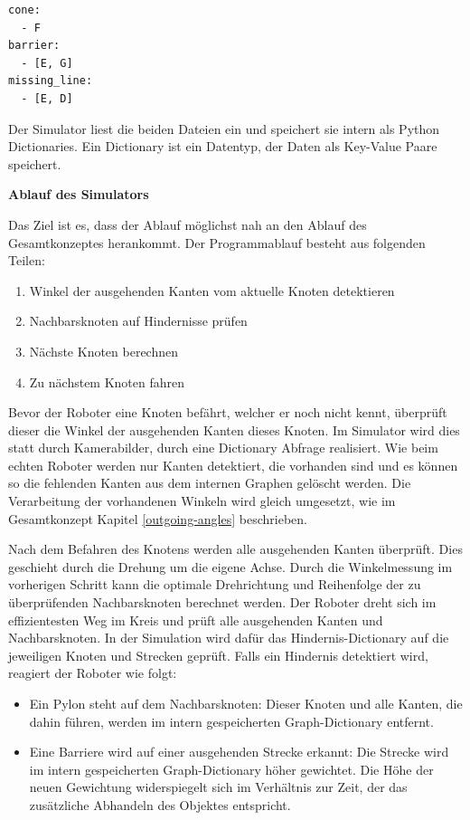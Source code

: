 \begin{verbatim}
cone:
  - F
barrier:
  - [E, G]
missing_line:
  - [E, D]
\end{verbatim}

Der Simulator liest die beiden Dateien ein und speichert sie intern als Python Dictionaries. Ein Dictionary ist ein Datentyp, der Daten als Key-Value Paare speichert.

\textbf{Ablauf des Simulators}

Das Ziel ist es, dass der Ablauf möglichst nah an den Ablauf des Gesamtkonzeptes herankommt.
Der Programmablauf besteht aus folgenden Teilen:
\begin{enumerate}
    \item Winkel der ausgehenden Kanten vom aktuelle Knoten detektieren
    \item Nachbarsknoten auf Hindernisse prüfen
    \item Nächste Knoten berechnen
    \item Zu nächstem Knoten fahren
\end{enumerate}

Bevor der Roboter eine Knoten befährt, welcher er noch nicht kennt, überprüft dieser die Winkel der ausgehenden Kanten dieses Knoten. Im Simulator wird dies statt durch Kamerabilder, durch eine Dictionary Abfrage realisiert.
Wie beim echten Roboter werden nur Kanten detektiert, die vorhanden sind und es können so die fehlenden Kanten aus dem internen Graphen gelöscht werden. Die Verarbeitung der vorhandenen Winkeln wird gleich umgesetzt, wie im Gesamtkonzept Kapitel \ref{outgoing-angles} beschrieben.

Nach dem Befahren des Knotens werden alle ausgehenden Kanten überprüft. Dies geschieht durch die Drehung um die eigene Achse. Durch die Winkelmessung im vorherigen Schritt kann die optimale Drehrichtung und Reihenfolge der zu überprüfenden Nachbarsknoten berechnet werden. Der Roboter dreht sich im effizientesten Weg im Kreis und prüft alle ausgehenden Kanten und Nachbarsknoten. 
In der Simulation wird dafür das Hindernis-Dictionary auf die jeweiligen Knoten und Strecken geprüft. Falls ein Hindernis detektiert wird, reagiert der Roboter wie folgt:

\begin{itemize}
    \item Ein Pylon steht auf dem Nachbarsknoten: Dieser Knoten und alle Kanten, die dahin führen, werden im intern gespeicherten Graph-Dictionary entfernt.
    \item Eine Barriere wird auf einer ausgehenden Strecke erkannt: Die Strecke wird im intern gespeicherten Graph-Dictionary höher gewichtet. Die Höhe der neuen Gewichtung widerspiegelt sich im Verhältnis zur Zeit, der das zusätzliche Abhandeln des Objektes entspricht.
\end{itemize}


